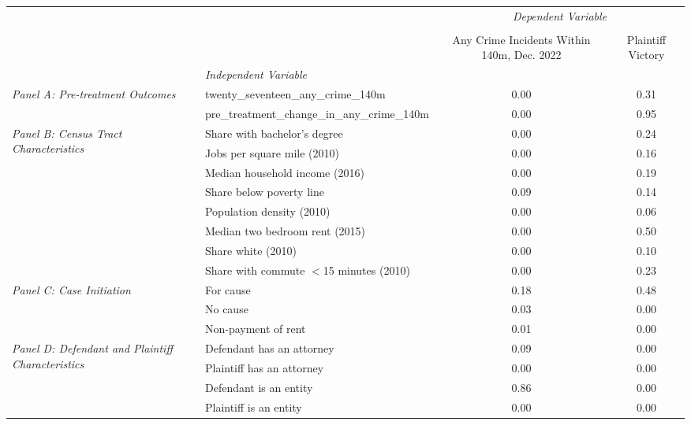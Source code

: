 \begin{tabular}{llcc}
\toprule
 &  & \multicolumn{2}{c}{\textit{Dependent Variable}} \\
\cline{3-4}
\\
 &  & Any Crime Incidents Within 140m, Dec. 2022 & Plaintiff Victory \\
 & \emph{Independent Variable} &  &  \\
\midrule
\multirow[c]{2}{3cm}{\textit{Panel A: Pre-treatment Outcomes}} & twenty_seventeen_any_crime_140m & 0.00 & 0.31 \\
 & pre_treatment_change_in_any_crime_140m & 0.00 & 0.95 \\
\cline{1-4}
\multirow[c]{8}{3cm}{\textit{Panel B: Census Tract Characteristics}} & Share with bachelor's degree & 0.00 & 0.24 \\
 & Jobs per square mile (2010) & 0.00 & 0.16 \\
 & Median household income (2016) & 0.00 & 0.19 \\
 & Share below poverty line & 0.09 & 0.14 \\
 & Population density (2010) & 0.00 & 0.06 \\
 & Median two bedroom rent (2015) & 0.00 & 0.50 \\
 & Share white (2010) & 0.00 & 0.10 \\
 & Share with commute $<$15 minutes (2010) & 0.00 & 0.23 \\
\cline{1-4}
\multirow[c]{3}{3cm}{\textit{Panel C: Case Initiation}} & For cause & 0.18 & 0.48 \\
 & No cause & 0.03 & 0.00 \\
 & Non-payment of rent & 0.01 & 0.00 \\
\cline{1-4}
\multirow[c]{4}{3cm}{\textit{Panel D: Defendant and Plaintiff Characteristics}} & Defendant has an attorney & 0.09 & 0.00 \\
 & Plaintiff has an attorney & 0.00 & 0.00 \\
 & Defendant is an entity & 0.86 & 0.00 \\
 & Plaintiff is an entity & 0.00 & 0.00 \\
\cline{1-4}
\bottomrule
\end{tabular}
